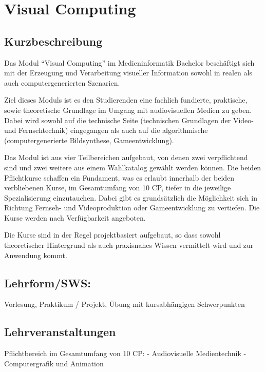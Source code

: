 \chapter{Visual Computing}\label{visual-computing}

\section{Kurzbeschreibung}\label{kurzbeschreibung-5}

Das Modul ``Visual Computing'' im Medieninformatik Bachelor beschäftigt
sich mit der Erzeugung und Verarbeitung visueller Information sowohl in
realen als auch computergenerierten Szenarien.

Ziel dieses Moduls ist es den Studierenden eine fachlich fundierte,
praktische, sowie theoretische Grundlage im Umgang mit audiovisuellen
Medien zu geben. Dabei wird sowohl auf die technische Seite (technischen
Grundlagen der Video- und Fernsehtechnik) eingegangen als auch auf die
algorithmische (computergenerierte Bildsynthese, Gameentwicklung).

Das Modul ist aus vier Teilbereichen aufgebaut, von denen zwei
verpflichtend sind und zwei weitere aus einem Wahlkatalog gewählt werden
können. Die beiden Pflichtkurse schaffen ein Fundament, was es erlaubt
innerhalb der beiden verbliebenen Kurse, im Gesamtumfang von 10 CP,
tiefer in die jeweilige Spezialisierung einzutauchen. Dabei gibt es
grundsätzlich die Möglichkeit sich in Richtung Fernseh- und
Videoproduktion oder Gameentwicklung zu vertiefen. Die Kurse werden nach
Verfügbarkeit angeboten.

Die Kurse sind in der Regel projektbasiert aufgebaut, so dass sowohl
theoretischer Hintergrund als auch praxisnahes Wissen vermittelt wird
und zur Anwendung kommt.

\section{Lehrform/SWS:}\label{lehrformsws-24}

Vorlesung, Praktikum / Projekt, Übung mit kursabhängigen Schwerpunkten

\section{Lehrveranstaltungen}\label{lehrveranstaltungen}

Pflichtbereich im Gesamtumfang von 10 CP: - Audiovisuelle Medientechnik
- Computergrafik und Animation

